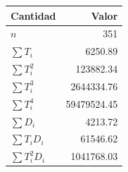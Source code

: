 \begin{tabular}{l r}
\toprule
Cantidad & Valor \\
\midrule
$n$ & \num{351} \\
$\sum T_i$ & \num{6250.89} \\
$\sum T_i^2$ & \num{123882.34} \\
$\sum T_i^3$ & \num{2644334.76} \\
$\sum T_i^4$ & \num{59479524.45} \\
$\sum D_i$ & \num{4213.72} \\
$\sum T_i D_i$ & \num{61546.62} \\
$\sum T_i^2 D_i$ & \num{1041768.03} \\
\bottomrule
\end{tabular}
